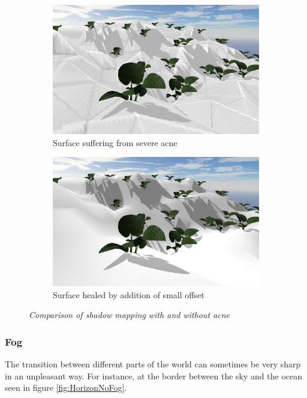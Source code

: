 \begin{figure}[H]
\begin{subfigure}{.5\textwidth}
  \centering
  \includegraphics[width=0.9\linewidth]{images/SMAcne.png}
  \caption{Surface suffering from severe acne}
  \label{fig:SMAcne}
\end{subfigure}%
\begin{subfigure}{.5\textwidth}
  \centering
  \includegraphics[width=0.9\linewidth]{images/SMAcneFix.png}
  \caption{Surface healed by addition of small offset}
  \label{fig:SMAcneFix}
\end{subfigure}
\caption[Noise comparison]{\textit{Comparison of shadow mapping with and without acne}}
\label{fig:AcneComparison}
\end{figure}


\subsubsection{Fog}
The transition between different parts of the world can sometimes be very sharp in an unpleasant way. For instance, at the border between the sky and the ocean seen in figure \ref{fig:HorizonNoFog}. 

